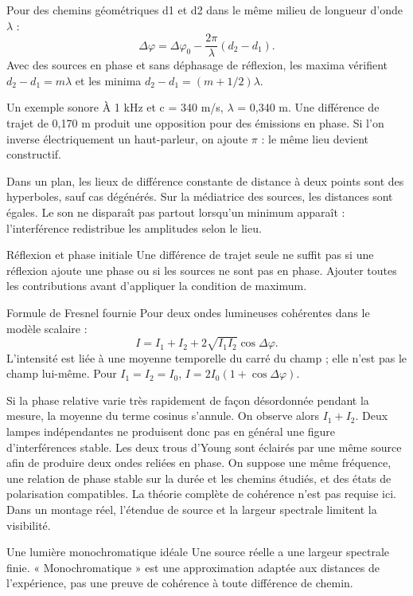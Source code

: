 Pour des chemins géométriques d1 et d2 dans le même milieu de longueur d’onde \ensuremath{\lambda} :\[\Delta\varphi=\Delta\varphi_0-\frac{2\pi}{\lambda}(d_2-d_1).\]Avec des sources en phase et sans déphasage de réflexion, les maxima vérifient $d_2-d_1=m\lambda$ et les minima $d_2-d_1=(m+1/2)\lambda$.
\begin{methode}{Un exemple sonore}
À 1 kHz et c = 340 m/s, \ensuremath{\lambda} = 0,340 m. Une différence de trajet de 0,170 m produit une opposition pour des émissions en phase. Si l’on inverse électriquement un haut-parleur, on ajoute \ensuremath{\pi} : le même lieu devient constructif.
\end{methode}
Dans un plan, les lieux de différence constante de distance à deux points sont des hyperboles, sauf cas dégénérés. Sur la médiatrice des sources, les distances sont égales. Le son ne disparaît pas partout lorsqu’un minimum apparaît : l’interférence redistribue les amplitudes selon le lieu.
\begin{piege}{Réflexion et phase initiale}
Une différence de trajet seule ne suffit pas si une réflexion ajoute une phase ou si les sources ne sont pas en phase. Ajouter toutes les contributions avant d’appliquer la condition de maximum.
\end{piege}


\begin{loi}{Formule de Fresnel fournie}
Pour deux ondes lumineuses cohérentes dans le modèle scalaire :\[I=I_1+I_2+2\sqrt{I_1I_2}\cos\Delta\varphi.\]L’intensité est liée à une moyenne temporelle du carré du champ ; elle n’est pas le champ lui-même. Pour $I_1=I_2=I_0$, $I=2I_0(1+\cos\Delta\varphi)$.
\end{loi}
Si la phase relative varie très rapidement de façon désordonnée pendant la mesure, la moyenne du terme cosinus s’annule. On observe alors $I_1+I_2$. Deux lampes indépendantes ne produisent donc pas en général une figure d’interférences stable. Les deux trous d’Young sont éclairés par une même source afin de produire deux ondes reliées en phase.
On suppose une même fréquence, une relation de phase stable sur la durée et les chemins étudiés, et des états de polarisation compatibles. La théorie complète de cohérence n’est pas requise ici. Dans un montage réel, l’étendue de source et la largeur spectrale limitent la visibilité.
\begin{piege}{Une lumière monochromatique idéale}
Une source réelle a une largeur spectrale finie. « Monochromatique » est une approximation adaptée aux distances de l’expérience, pas une preuve de cohérence à toute différence de chemin.
\end{piege}


